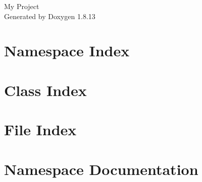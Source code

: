 \documentclass[twoside]{book}
\newcommand{\+}{\discretionary{\mbox{\scriptsize$\hookleftarrow$}}{}{}}
\newcommand{\clearemptydoublepage}{%
  \newpage{\pagestyle{empty}\cleardoublepage}%
}
\begin{document}
\hypersetup{pageanchor=false,
             bookmarksnumbered=true,
             pdfencoding=unicode
            }
\begin{titlepage}
\vspace*{7cm}
\begin{center}%
{\Large My Project }\\
\vspace*{1cm}
{\large Generated by Doxygen 1.8.13}\\
\end{center}
\end{titlepage}
\clearemptydoublepage
{}
\tableofcontents
\clearemptydoublepage
{}
\hypersetup{pageanchor=true}

\chapter{Namespace Index}

\chapter{Class Index}

\chapter{File Index}

\chapter{Namespace Documentation}

\end{document}
